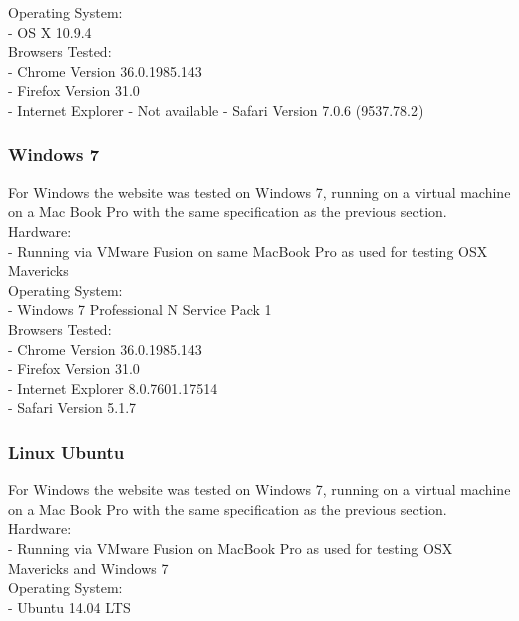 \documentclass[a4paper,11pt,titlepage]{article}
\begin{document}
\noindent Operating System:\\
- OS X 10.9.4\\

\noindent Browsers Tested:\\
- Chrome Version 36.0.1985.143\\
- Firefox Version 31.0\\
- Internet Explorer - Not available
- Safari Version 7.0.6 (9537.78.2)\\

\subsubsection*{Windows 7}

For Windows the website was tested on Windows 7, running on a virtual machine on a Mac Book Pro with the same specification as the previous section.\\

\noindent Hardware:\\
- Running via VMware Fusion on same MacBook Pro as used for testing OSX Mavericks\\

\noindent Operating System:\\
- Windows 7 Professional N Service Pack 1\\

\noindent Browsers Tested:\\
- Chrome Version 36.0.1985.143\\
- Firefox Version 31.0\\
- Internet Explorer 8.0.7601.17514\\
- Safari Version 5.1.7\\


\subsubsection*{Linux Ubuntu}

For Windows the website was tested on Windows 7, running on a virtual machine on a Mac Book Pro with the same specification as the previous section.\\

\noindent Hardware:\\
- Running via VMware Fusion on MacBook Pro as used for testing OSX Mavericks and Windows 7\\

\noindent Operating System:\\
- Ubuntu 14.04 LTS\\
\end{document}
